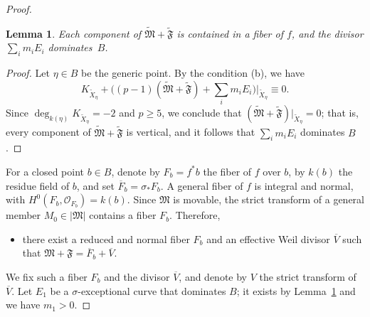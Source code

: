\documentclass[reqno,oneside]{amsart}
\newtheorem{lemma}[theorem]{Lemma}
\theoremstyle{definition}
\theoremstyle{plain}
\numberwithin{equation}{section}
\begin{document}
\begin{proof}
\begin{lemma}\label{lemma-E1-horizontal}
    Each component of $\widetilde{\mathfrak{M} } + \widetilde{\mathfrak{F}}$ is contained in a fiber of $f$, and the divisor $\sum_i m_i E_i$ dominates~$B$.
\end{lemma}
\begin{proof}
  Let $\eta\in B$ be the generic point.
  By the condition (b), we have 
  $$K_{\widetilde{X}_{\eta}} + \bigl((p-1) (\widetilde{\mathfrak{M} } + \widetilde{\mathfrak{F}}) + \sum_i m_i E_i\bigr)\big|_{\widetilde{X}_{\eta}} \equiv 0.$$
  Since $\deg_{k(\eta)} K_{\widetilde{X}_{\eta}} = -2$ and $p\geq 5$, we conclude that $ (\widetilde{\mathfrak{M} } + \widetilde{\mathfrak{F}})|_{\widetilde{X}_{\eta}} =0$; that is, every component of $\widetilde{\mathfrak{M} } + \widetilde{\mathfrak{F}}$ is vertical, and it follows that $\sum_i m_i E_i$ dominates $B$.
\end{proof}

For a closed point $b\in B$, denote by $F_b=f^*b$ the fiber of $f$ over $b$, by $k(b)$ the residue field of $b$, and set $\overline{F}_b=\sigma_*F_b$.
A general fiber of $f$ is integral and normal, with $H^0(F_b, \mathcal{O}_{F_b}) = k(b)$.
Since $\mathfrak{M}$ is movable, the strict transform of a general member $M_0\in |\mathfrak{M}|$ contains a fiber $F_b$. Therefore,
\begin{itemize}
  \item[\rm(c)] there exist a reduced and normal fiber $F_b$ and an effective Weil divisor $\overline{V}$ such that $\mathfrak{M} + \mathfrak{F} = \overline{F}_b + \overline{V}$.
\end{itemize}
We fix such a fiber $F_b$ and the divisor $\overline{V}$, and denote by $V$ the strict transform of $\overline{V}$.
Let $E_1$ be a $\sigma$-exceptional curve that dominates $B$; it exists by Lemma~\ref{lemma-E1-horizontal} and we have $m_1>0$.


\end{proof}
\end{document}
